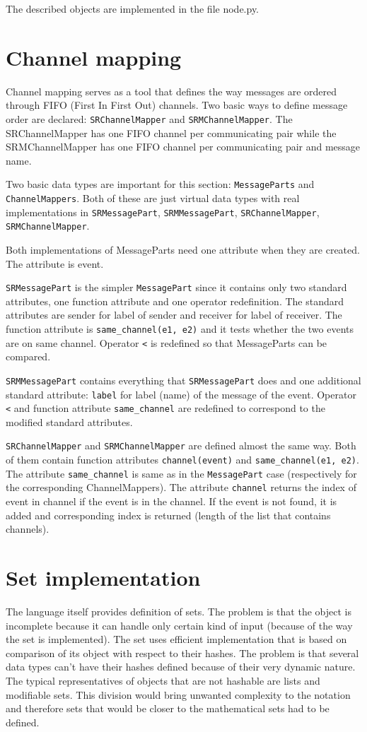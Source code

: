 \documentclass[11pt,oneside]{fithesis2}
\newcommand{\T}[1]{\texttt{#1}}
\begin{document}
The described objects are implemented in the file node.py.


\section{Channel mapping}
Channel mapping serves as a tool that defines the way messages are ordered through FIFO (First In First Out) channels. Two basic ways to define message order are declared: \T{SRChannelMapper} and \T{SRMChannelMapper}. The SRChannelMapper has one FIFO channel per communicating pair while the SRMChannelMapper has one FIFO channel per communicating pair and message name.

Two basic data types are important for this section: \T{MessageParts} and \T{ChannelMappers}. Both of these are just virtual data types with real implementations in \T{SRMessagePart}, \T{SRMMessagePart}, \T{SRChannelMapper}, \T{SRMChannelMapper}.

Both implementations of MessageParts need one attribute when they are created. The attribute is event.

\T{SRMessagePart} is the simpler \T{MessagePart} since it contains only two standard attributes, one function attribute and one operator redefinition. The standard attributes are sender for label of sender and receiver for label of receiver. The function attribute is \T{same\_channel(e1, e2)} and it tests whether the two events are on same channel. Operator \T{<} is redefined so that MessageParts can be compared.

\T{SRMMessagePart} contains everything that \T{SRMessagePart} does and one additional standard attribute: \T{label} for label (name) of the message of the event. Operator \T{<} and function attribute \T{same\_channel} are redefined to correspond to the modified standard attributes.

\T{SRChannelMapper} and \T{SRMChannelMapper} are defined almost the same way. Both of them contain function attributes \T{channel(event)} and \T{same\_channel(e1, e2)}. The attribute \T{same\_channel} is same as in the \T{MessagePart} case (respectively for the corresponding ChannelMappers). The attribute \T{channel} returns the index of event in channel if the event is in the channel. If the event is not found, it is added and corresponding index is returned (length of the list that contains channels).


\section{Set implementation}
The language itself provides definition of sets. The problem is that the object is incomplete because it can handle only certain kind of input (because of the way the set is implemented). The set uses efficient implementation that is based on comparison of its object with respect to their hashes. The problem is that several data types can't have their hashes defined because of their very dynamic nature. The typical representatives of objects that are not hashable are lists and modifiable sets. This division would bring unwanted complexity to the notation and therefore sets that would be closer to the mathematical sets had to be defined.
\end{document}
